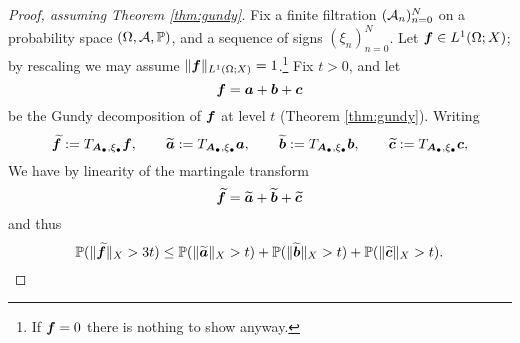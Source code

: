 \begin{proof}[Proof, assuming Theorem \ref{thm:gundy}]
  Fix a finite filtration $(\mathcal{A}_{n})_{n=0}^{N}$ on a probability space $(\Omega,\mathcal{A},\mathbb{P})$, and a sequence of signs $(\xi_{n})_{n=0}^{N}$.
  Let $\bm{f} \in L^1(\Omega;X)$; by rescaling we may assume $\|\bm{f}\|_{L^1(\Omega;X)} = 1$.\footnote{If $\bm{f} = 0$ there is nothing to show anyway.}
  Fix $t > 0$, and let
  \begin{equation*}
    \bm{f} = \bm{a} + \bm{b} + \bm{c}
  \end{equation*}
  be the Gundy decomposition of $\bm{f}$ at level $t$ (Theorem \ref{thm:gundy}).
  Writing
  \begin{equation*}
    \widetilde{\bm{f}} := T_{\bm{A}_{\bullet}, \xi_{\bullet}}\bm{f},
    \qquad \widetilde{\bm{a}} := T_{\bm{A}_{\bullet}, \xi_{\bullet}}\bm{a},
    \qquad \widetilde{\bm{b}} := T_{\bm{A}_{\bullet}, \xi_{\bullet}}\bm{b},
    \qquad \widetilde{\bm{c}} := T_{\bm{A}_{\bullet}, \xi_{\bullet}}\bm{c},
  \end{equation*}
  We have by linearity of the martingale transform
  \begin{equation*}
    \widetilde{\bm{f}} = \widetilde{\bm{a}} + \widetilde{\bm{b}} + \widetilde{\bm{c}}
  \end{equation*}
  and thus
  \begin{equation*}
    \mathbb{P}(\|\widetilde{\bm{f}}\|_{X} > 3t)
    \leq \mathbb{P}(\|\widetilde{\bm{a}}\|_{X} > t) + \mathbb{P}(\|\widetilde{\bm{b}}\|_{X} > t) + \mathbb{P}(\|\widetilde{\bm{c}}\|_{X} > t).
  \end{equation*}


\end{proof}
